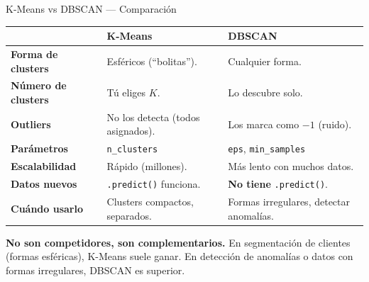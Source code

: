 \documentclass[aspectratio=169, 11pt]{beamer}
\begin{document}
\begin{frame}[shrink=5]{K-Means vs DBSCAN --- Comparaci\'on}
  \vspace{-4pt}
  {\scriptsize
  \begin{tabular}{@{}p{3cm}p{4.5cm}p{4.5cm}@{}}
    \toprule
     & \textbf{\color{codeBlue}K-Means} & \textbf{\color{codeGreen}DBSCAN} \\
    \midrule
    \textbf{Forma de clusters} & Esf\'ericos (``bolitas''). & Cualquier forma. \\
    \textbf{N\'umero de clusters} & T\'u eliges $K$. & Lo descubre solo. \\
    \textbf{Outliers} & No los detecta (todos asignados). & Los marca como $-1$ (ruido). \\
    \textbf{Par\'ametros} & \texttt{n\_clusters} & \texttt{eps}, \texttt{min\_samples} \\
    \textbf{Escalabilidad} & R\'apido (millones). & M\'as lento con muchos datos. \\
    \textbf{Datos nuevos} & \texttt{.predict()} funciona. & \textbf{No tiene} \texttt{.predict()}. \\
    \textbf{Cu\'ando usarlo} & Clusters compactos, separados. & Formas irregulares, detectar anomal\'ias. \\
    \bottomrule
  \end{tabular}
  }

  \vspace{6pt}
  \begin{tcolorbox}[colback=codeGreen!8, colframe=codeGreen, boxrule=0.5pt, arc=2pt,
    left=6pt, right=6pt, top=4pt, bottom=4pt]
    {\scriptsize\color{arcaDark}
    \faKey\hspace{4pt}\textbf{No son competidores, son complementarios.}
    En segmentaci\'on de clientes (formas esf\'ericas), K-Means
    suele ganar. En detecci\'on de anomal\'ias o datos con formas
    irregulares, DBSCAN es superior.}
  \end{tcolorbox}
\end{frame}
\end{document}
